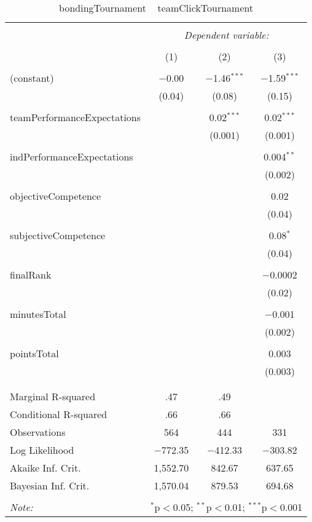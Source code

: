 
\begin{table}[!htbp] \centering 
  \caption{bondingTournament ~ teamClickTournament} 
  \label{tab:MLM31bclickBondingTournament} 
\footnotesize 
\begin{tabular}{@{\extracolsep{5pt}}lccc} 
\\[-1.8ex]\hline 
\hline \\[-1.8ex] 
 & \multicolumn{3}{c}{\textit{Dependent variable:}} \\ 
\cline{2-4} 
\\[-1.8ex] & (1) & (2) & (3)\\ 
\hline \\[-1.8ex] 
 (constant) & $-$0.00 & $-$1.46$^{***}$ & $-$1.59$^{***}$ \\ 
  & (0.04) & (0.08) & (0.15) \\ 
  & & & \\ 
 teamPerformanceExpectations &  & 0.02$^{***}$ & 0.02$^{***}$ \\ 
  &  & (0.001) & (0.001) \\ 
  & & & \\ 
 indPerformanceExpectations &  &  & 0.004$^{**}$ \\ 
  &  &  & (0.002) \\ 
  & & & \\ 
 objectiveCompetence &  &  & 0.02 \\ 
  &  &  & (0.04) \\ 
  & & & \\ 
 subjectiveCompetence &  &  & 0.08$^{*}$ \\ 
  &  &  & (0.04) \\ 
  & & & \\ 
 finalRank &  &  & $-$0.0002 \\ 
  &  &  & (0.02) \\ 
  & & & \\ 
 minutesTotal &  &  & $-$0.001 \\ 
  &  &  & (0.002) \\ 
  & & & \\ 
 pointsTotal &  &  & 0.003 \\ 
  &  &  & (0.003) \\ 
  & & & \\ 
\hline \\[-1.8ex] 
Marginal R-squared & .47 & .49 &  \\ 
Conditional R-squared & .66 & .66 &  \\ 
Observations & 564 & 444 & 331 \\ 
Log Likelihood & $-$772.35 & $-$412.33 & $-$303.82 \\ 
Akaike Inf. Crit. & 1,552.70 & 842.67 & 637.65 \\ 
Bayesian Inf. Crit. & 1,570.04 & 879.53 & 694.68 \\ 
\hline 
\hline \\[-1.8ex] 
\textit{Note:}  & \multicolumn{3}{r}{$^{*}$p$<$0.05; $^{**}$p$<$0.01; $^{***}$p$<$0.001} \\ 
\end{tabular} 
\end{table} 
